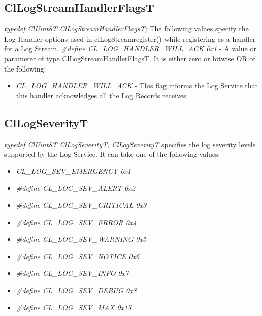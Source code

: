 \begin{flushleft}
\begin{itemize}
\subsection{ClLogStreamHandlerFlagsT}
\textit{typedef ClUint8T ClLogStreamHandlerFlagsT;}
\newline
\newline
The following values specify the Log Handler options used in clLogStreamregister() while registering as a handler for a Log Stream.
\newline 
\newline
\textit{#define CL_LOG_HANDLER_WILL_ACK	0x1} - A value or parameter of type ClLogStreamHandlerFlagsT. It is either zero or bitwise OR of the following: 
\begin{itemize}
\item
\textit{CL_LOG_HANDLER_WILL_ACK} - This flag informs the Log Service that this handler acknowledges all the Log Records receives.
\end{itemize}




\subsection{ClLogSeverityT}
\textit{typedef ClUint8T ClLogSeverityT;}
\newline
\newline
\textit{ClLogSeverityT} specifies the log severity levels supported by the Log Service. It can take one of the following values:
\begin{itemize}
\item \textit{CL\_\-LOG\_\-SEV\_\-EMERGENCY 0x1}
	\item\textit{#define CL\_\-LOG\_\-SEV\_\-ALERT 0x2}
	\item\textit{#define CL\_\-LOG\_\-SEV\_\-CRITICAL 0x3}
	\item\textit{#define CL\_\-LOG\_\-SEV\_\-ERROR 0x4}
	\item\textit{#define CL\_\-LOG\_\-SEV\_\-WARNING 0x5}
	\item\textit{#define CL\_\-LOG\_\-SEV\_\-NOTICE 0x6}
	\item\textit{#define CL\_\-LOG\_\-SEV\_\-INFO 0x7}
	\item\textit{#define CL\_\-LOG\_\-SEV\_\-DEBUG 0x8}
	\item\textit{#define CL\_\-LOG\_\-SEV\_\-MAX 0x15}
\end{itemize}	



\end{itemize}
\end{flushleft}
